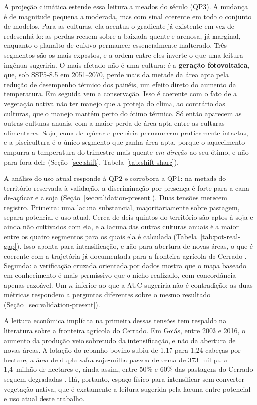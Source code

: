A projeção climática estende essa leitura a meados do século (QP3). A mudança é de magnitude
pequena a moderada, mas com sinal coerente em todo o conjunto de modelos. Para as culturas, ela
acentua o gradiente já existente em vez de redesenhá-lo: as perdas recaem sobre a baixada quente
e arenosa, já marginal, enquanto o planalto de cultivo permanece essencialmente inalterado. Três
segmentos são os mais expostos, e a ordem entre eles inverte o que uma leitura ingênua sugeriria. O
mais afetado não é uma cultura: é a \textbf{geração fotovoltaica}, que, sob SSP5-8.5 em 2051--2070,
perde mais da metade da área apta pela redução de desempenho térmico dos painéis, um efeito direto do 
aumento da temperatura. Em seguida vem a conservação. Isso é coerente com o fato de a
vegetação nativa não ter manejo que a proteja do clima, ao contrário das culturas, que o manejo mantém
perto do ótimo térmico. Só então aparecem as outras culturas anuais, com a maior perda de área apta
entre as culturas alimentares. Soja, cana-de-açúcar e pecuária permanecem praticamente intactas, e a
piscicultura é o único segmento que ganha área apta, porque o aquecimento empurra a temperatura do
trimestre mais quente \emph{em direção} ao seu ótimo, e não para fora dele (Seção~\ref{sec:shift},
Tabela~\ref{tab:shift-share}).

A análise do uso atual responde à QP2 e corrobora a QP1: na metade do território reservada à
validação, a discriminação por presença é forte para a cana-de-açúcar e a soja
(Seção~\ref{sec:validation-present}). Duas tensões merecem registro. Primeira: uma lacuna substancial,
majoritariamente sobre pastagem, separa potencial e uso atual. Cerca de dois quintos do território são
aptos à soja e ainda não cultivados com ela, e a lacuna das outras culturas anuais é a maior entre os
quatro segmentos para os quais ela é calculada (Tabela~\ref{tab:pot-real-gap}). Isso aponta para
intensificação, e não para abertura de novas áreas, o que é coerente com a trajetória já documentada
para a fronteira agrícola do Cerrado
\citep{spera_agricultural_2017,caballero_transformation_2023}. Segunda: a verificação cruzada
orientada por dados mostra que o mapa baseado em conhecimento é mais permissivo que o nicho realizado,
com concordância apenas razoável. Um $\kappa$ inferior ao que a AUC sugeriria não é contradição: as
duas métricas respondem a perguntas diferentes sobre o mesmo resultado
(Seção~\ref{sec:validation-present}).

A leitura econômica implícita na primeira dessas tensões tem respaldo na literatura sobre a
fronteira agrícola do Cerrado. Em Goiás, entre 2003 e 2016, o aumento da produção veio sobretudo da
intensificação, e não da abertura de novas áreas. A lotação do rebanho bovino subiu de 1,17 para
1,24 cabeças por hectare, a área de dupla safra soja-milho passou de cerca de 373~mil para 1,4~milhão
de hectares e, ainda assim, entre 50\% e 60\% das pastagens do Cerrado seguem degradadas
\citep[pp.~2, 4]{spera_agricultural_2017}. Há, portanto, espaço físico para intensificar sem converter
vegetação nativa, que é exatamente a leitura sugerida pela lacuna entre potencial e uso atual deste
trabalho.


